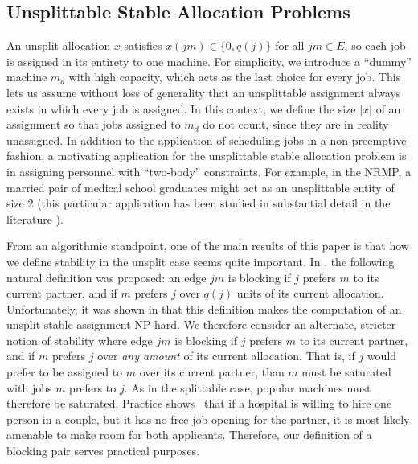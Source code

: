 \documentclass{llncs}
\begin{document}
\iffalse
Ba\"iou and Balinski
prove that each agent can compare any two fractional stable
allocations as a consequence of the rural hospital theorem.  
\fi

\subsection{Unsplittable Stable Allocation Problems}
An unsplit allocation $x$ satisfies $x(jm) \in \{0, q(j)\}$ for all
$jm \in E$, so each job is assigned in its entirety to one machine.
For simplicity, we introduce a ``dummy'' machine $m_d$ with high
capacity, which acts as the last choice for every job.  This lets us
assume without loss of generality that an unsplittable assignment
always exists in which every job is assigned.  In this context,
we define the size $|x|$ of an assignment so that jobs assigned
to $m_d$ do not count, since they are in reality unassigned.
In addition to the application of scheduling jobs in a non-preemptive
fashion, a motivating application for the unsplittable stable
allocation problem is in assigning personnel with ``two-body''
constraints.  For example, in the NRMP, a married pair of medical
school graduates might act as an unsplittable entity of size 2 (this
particular application has been studied in substantial detail in the
literature
\cite{Biro_emp,couples_survey,journals/jal/Ronn90,Roth84theevolution}).

From an algorithmic standpoint, one of the main results of this paper
is that how we define stability in the unsplit case seems quite
important.  In \cite{DBLP:journals/jco/McDermidM10}, the following
natural definition was proposed: an edge $jm$ is blocking if $j$
prefers $m$ to its current partner, and if $m$ prefers $j$ over $q(j)$
units of its current allocation.  Unfortunately, it was shown in
\cite{DBLP:journals/jco/McDermidM10} that this definition makes the
computation of an unsplit stable assignment NP-hard.  We therefore
consider an alternate, stricter notion of stability where edge $jm$ is
blocking if $j$ prefers $m$ to its current partner, and if $m$ prefers
$j$ over {\em any amount} of its current allocation.  That is, if $j$
would prefer to be assigned to $m$ over its current partner, than $m$
must be saturated with jobs $m$ prefers to $j$.  As in the splittable
case, popular machines must therefore be saturated. Practice shows~\cite{Roth96} that if a hospital is willing to hire one person in a couple, but it has no free job opening for the partner, it is most likely amenable to make room for both applicants. Therefore, our definition of a blocking pair serves practical purposes.
\end{document}
